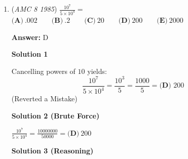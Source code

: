 \begin{enumerate}
\textbf{Solution 4 (Arithmetic Series Formula)}

Recall that the sum of an arithmetic series is $\frac{n}{2} (a_1+a_n)$, where $n$ is the number of terms, $a_1$ is the first term and $a_n$ is the last term.

 Therefore, the sum of this series is $\frac{10}{2}(90+99)=\boxed{\textbf{(B)}\ 945}$.

 



\textbf{Solution 5 (Difference of Triangular Numbers)}

Notice that this expression is the sum of the first $99$ positive integers minus the sum of the first $89$ positive integers, that is,  $\frac{99\cdot100}{2} - \frac{89\cdot90}{2} = 4950 - 4005 = \boxed{\textbf{(B)}\ 945}$.

 



\textbf{Solution 6 (Answer Choices, Estimation)}

Since all the terms are between $90$ and $100$, the sum must be between $10 \cdot 90 = 900$ and $10 \cdot 100 = 1000$. Only  $\boxed{\textbf{(B)}\ 945}$ is between $900$ and $1000$.

 



\textbf{Solution 7 (Brute Force)}

Adding all the terms yields $\boxed{\textbf{(B)}\ 945}$.

 


 


	\item (\textit{AMC 8 1985}) $\frac{10^7}{5\times 10^4}=$
$\textbf{(A)}\ .002 \qquad \textbf{(B)}\ .2 \qquad \textbf{(C)}\ 20 \qquad \textbf{(D)}\ 200 \qquad \textbf{(E)}\ 2000$

 \textbf{Answer: }D



\textbf{Solution 1}

Cancelling powers of $10$ yields:
 \[\frac{10^7}{5 \times 10^4} = \frac{10^3}{5} = \frac{1000}{5} = \boxed{\textbf{(D) } 200}\] (Reverted a Mistake)

 



\textbf{Solution 2 (Brute Force)}

$\frac{10^7}{5\times 10^4}=\frac{10000000}{50000}=\boxed{\textbf{(D)}\ 200}$




\textbf{Solution 3 (Reasoning)}


\end{enumerate}
